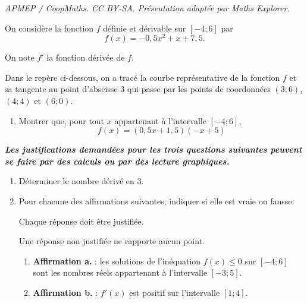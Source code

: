 \documentclass[10pt]{article}
\begin{document}
\noindent\textit{APMEP / CoopMaths. CC BY-SA. Présentation adaptée par Maths Explorer.}\par\medskip
On considère la fonction $f$ définie et dérivable sur $[-4 ; 6]$ par
\[f(x) = -0,5x^2 +  x + 7,5.\]

On note $f'$ la fonction dérivée de $f$.

Dans le repère ci-dessous, on a tracé la courbe représentative de la fonction $f$ et sa tangente au point d'abscisse 3 qui passe par les points de coordonnées $(3 ; 6)$, $(4 ; 4)$ et $(6 ; 0)$.

\begin{center}
\end{center}
\begin{enumerate}
\item Montrer que, pour tout $x$ appartenant à l'intervalle $[-4 ; 6]$,
\[
f(x)=(0,5x + 1,5)(-x+5)
\]
\end{enumerate}

\textbf{\emph{Les justifications demandées pour les trois questions suivantes peuvent se faire par des calculs ou par des lecture graphiques.}}


\begin{enumerate}[resume]
\item Déterminer le nombre dérivé en 3.
\item Pour chacune des affirmations suivantes, indiquer si elle est vraie ou fausse.

Chaque réponse doit être justifiée.

Une réponse non justifiée ne rapporte aucun point.
\begin{enumerate}
\item \textbf{Affirmation a.} : les solutions de l'inéquation $f(x)\leqslant 0$ sur $[-4 ; 6]$ sont les nombres réels appartenant à l'intervalle $[-3 ; 5]$.


\item \textbf{Affirmation b.} : $f'(x)$ est positif sur l'intervalle $[1 ; 4]$.
\end{enumerate}
\end{enumerate}
\end{document}

